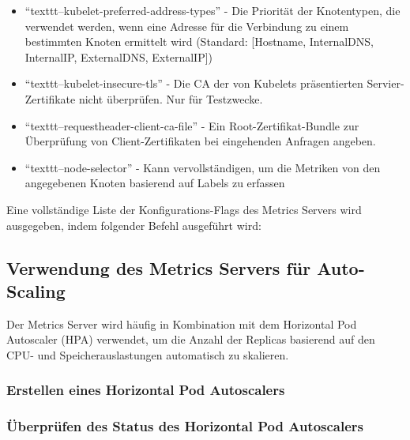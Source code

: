 \begin{itemize}
    \item \enquote{texttt{--kubelet-preferred-address-types}} - Die Priorität der Knotentypen, die verwendet werden, wenn eine Adresse für die Verbindung zu einem bestimmten Knoten ermittelt wird (Standard: [Hostname, InternalDNS, InternalIP, ExternalDNS, ExternalIP])
    \item \enquote{texttt{--kubelet-insecure-tls}} - Die CA der von Kubelets präsentierten Servier-Zertifikate nicht überprüfen. Nur für Testzwecke.
    \item \enquote{texttt{--requestheader-client-ca-file}} - Ein Root-Zertifikat-Bundle zur Überprüfung von Client-Zertifikaten bei eingehenden Anfragen angeben.
    \item \enquote{texttt{--node-selector}} - Kann vervollständigen, um die Metriken von den angegebenen Knoten basierend auf Labels zu erfassen
\end{itemize}

Eine vollständige Liste der Konfigurations-Flags des Metrics Servers wird ausgegeben, indem folgender Befehl ausgeführt wird:



\subsection{Verwendung des Metrics Servers für Auto-Scaling}
Der Metrics Server wird häufig in Kombination mit dem Horizontal Pod Autoscaler (HPA) verwendet, um die Anzahl der Replicas basierend auf den CPU- und Speicherauslastungen automatisch zu skalieren.

\subsubsection{Erstellen eines Horizontal Pod Autoscalers}



\subsubsection{Überprüfen des Status des Horizontal Pod Autoscalers}



